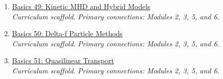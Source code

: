 \documentclass[11pt]{article}
\begin{document}
\begin{enumerate}[leftmargin=2.4em]
\item[\textbf{49.}] \href{run:basics_49_kinetic_mhd_and_hybrid_models.pdf}{Basics 49: Kinetic MHD and Hybrid Models}\\[-0.2em]
\textit{Curriculum scaffold}. \textit{Primary connections: Modules 2, 3, 5, and 6.}
\item[\textbf{50.}] \href{run:basics_50_delta_f_particle_methods.pdf}{Basics 50: Delta-f Particle Methods}\\[-0.2em]
\textit{Curriculum scaffold}. \textit{Primary connections: Modules 2, 3, 5, and 6.}
\item[\textbf{51.}] \href{run:basics_51_quasilinear_transport.pdf}{Basics 51: Quasilinear Transport}\\[-0.2em]
\textit{Curriculum scaffold}. \textit{Primary connections: Modules 2, 3, 5, and 6.}
\end{enumerate}
\end{document}
